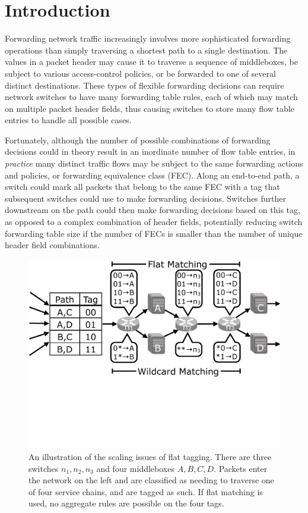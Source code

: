 \section{Introduction}
\label{sec:intro}

Forwarding network traffic increasingly involves more sophisticated
forwarding operations than simply traversing a shortest path to a single
destination.  The values in a packet header may cause it to traverse a
sequence of middleboxes, be subject to various access-control policies,
or be forwarded to one of several distinct destinations. These types of
flexible forwarding decisions can require network switches to have many
forwarding table rules, each of which may match on multiple packet
header fields, thus causing switches to store many flow table entries to
handle all possible cases. 

Fortunately, although the number of possible
combinations of forwarding decisions could in theory result in an
inordinate number of flow table entries, in {\em practice} many distinct
traffic flows may be subject to the same forwarding actions and
policies, or {forwarding equivalence class} (FEC). Along an end-to-end
path, a switch could mark all packets that belong to the same FEC with a
tag that subsequent switches could use to make forwarding
decisions. Switches further downstream on the path could then make
forwarding decisions based on this tag, as opposed to a complex
combination of header fields, potentially reducing switch forwarding
table size if the number of FECs is smaller than the number of unique
header field combinations.

\begin{figure}[t!] 
\begin{minipage}{1\linewidth}
\includegraphics[trim={0 10cm 0 0}, clip, width=\linewidth]{figures/mbox_path_example}
\end{minipage} 
\caption{An illustration of the scaling issues of flat tagging. There are three switches $n_1, n_2, n_3$ and four middleboxes $A,B,C,D$. Packets enter the network on the left and are classified as needing to traverse one of four service chains, and are tagged as such. If flat matching is used, no aggregate rules are possible on the four tags.  }
\label{fig:mbox_path}
\end{figure}

